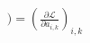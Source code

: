 \documentclass[preview]{standalone}
\begin{document}
\begin{align*}
) = ( \frac{\partial \mathcal{L}}{\partial a_{i,k}} )_{i,k}
\end{align*}
\end{document}
